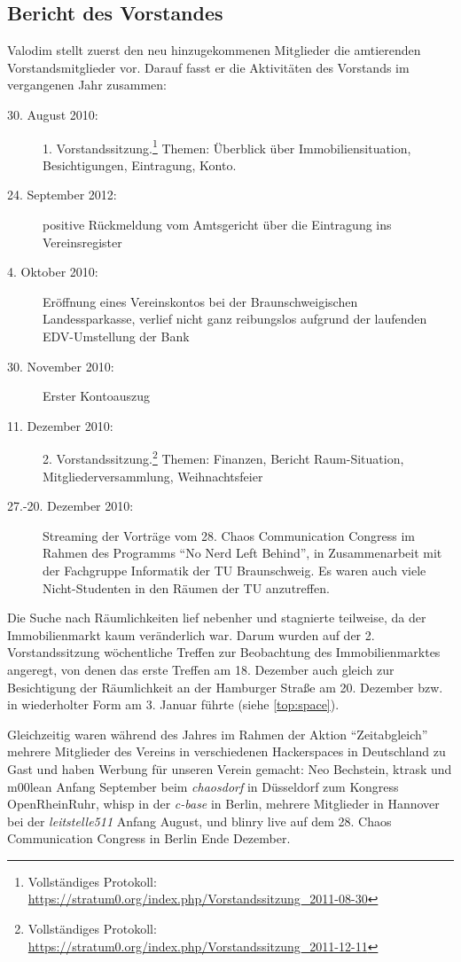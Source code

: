 \documentclass[a4paper,12pt]{scrartcl}
\begin{document}
\subsection{Bericht des Vorstandes}
Valodim stellt zuerst den neu hinzugekommenen Mitglieder die amtierenden
Vorstandsmitglieder vor. Darauf fasst er die Aktivitäten des Vorstands im
vergangenen Jahr zusammen:
\begin{description}
  \item[30. August 2010:] 1. Vorstandssitzung.\footnote{Vollständiges
    Protokoll: \url{https://stratum0.org/index.php/Vorstandssitzung_2011-08-30}}
    Themen: Überblick über Immobiliensituation, Besichtigungen, Eintragung,
    Konto.
  \item[24. September 2012:] positive Rückmeldung vom Amtsgericht über die
    Eintragung ins Vereinsregister
  \item[4. Oktober 2010:] Eröffnung eines Vereinskontos bei der
    Braunschweigischen Landessparkasse, verlief nicht ganz reibungslos aufgrund
    der laufenden EDV-Umstellung der Bank
  \item[30. November 2010:] Erster Kontoauszug
  \item[11. Dezember 2010:] 2. Vorstandssitzung.\footnote{Vollständiges
    Protokoll: \url{https://stratum0.org/index.php/Vorstandssitzung_2011-12-11}}
    Themen: Finanzen, Bericht Raum-Situation, Mitgliederversammlung, 
    Weihnachtsfeier
  \item[27.-20. Dezember 2010:] Streaming der Vorträge vom 28. Chaos
    Communication Congress im Rahmen des Programms "`No Nerd Left Behind"', in
    Zusammenarbeit mit der Fachgruppe Informatik der TU Braunschweig. Es waren
    auch viele Nicht-Studenten in den Räumen der TU anzutreffen.
\end{description}

Die Suche nach Räumlichkeiten lief nebenher und stagnierte teilweise, da der 
Immobilienmarkt kaum veränderlich war. Darum wurden auf der 2. Vorstandssitzung
wöchentliche Treffen zur Beobachtung des Immobilienmarktes angeregt, von denen
das erste Treffen am 18. Dezember auch gleich zur Besichtigung der Räumlichkeit
an der Hamburger Straße am 20. Dezember bzw. in wiederholter Form am 3. Januar
führte (siehe \ref{top:space}).

Gleichzeitig waren während des Jahres im Rahmen der Aktion "`Zeitabgleich"'
mehrere Mitglieder des Vereins in verschiedenen Hackerspaces in Deutschland zu
Gast und haben Werbung für unseren Verein gemacht: Neo Bechstein, ktrask und
m00lean Anfang September beim \emph{chaosdorf} in Düsseldorf zum Kongress 
OpenRheinRuhr, whisp in der \emph{c-base} in Berlin, mehrere Mitglieder in 
Hannover bei der \emph{leitstelle511} Anfang August, und blinry live auf dem 
28. Chaos Communication Congress in Berlin Ende Dezember.
\end{document}
